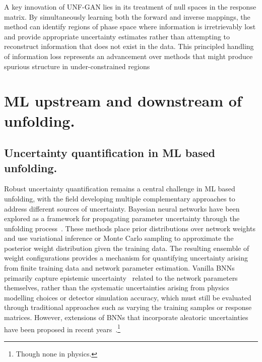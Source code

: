    A key innovation of UNF-GAN lies in its treatment of null spaces in the response matrix.
    By simultaneously learning both the forward and inverse mappings, the method can identify regions of phase space where information is irretrievably lost and provide appropriate uncertainty estimates rather than attempting to reconstruct information that does not exist in the data.
    This principled handling of information loss represents an advancement over methods that might produce spurious structure in under-constrained regions
\section{ML upstream and downstream of unfolding.}
    \subsection{Uncertainty quantification in ML based unfolding.}
    
    Robust uncertainty quantification remains a central challenge in ML based unfolding, with the field developing multiple complementary approaches to address different sources of uncertainty.
    Bayesian neural networks have been explored as a framework for propagating parameter uncertainty through the unfolding process~\cite{brehmer_guide_2018,Feindt:2004wla,Zhong:2011xm,perryBayesianNeuralNetworks2014,Chua:2019wwt,izmailovWhatAreBayesian2021,hronWideBayesianNeural2022,wenzelHowGoodBayes2020,Huetsch:2024quz,bonnevilleBayesianDeepLearning2022}.
    These methods place prior distributions over network weights and use variational inference or Monte Carlo sampling to approximate the posterior weight distribution given the training data.
    The resulting ensemble of weight configurations provides a mechanism for quantifying uncertainty arising from finite training data and network parameter estimation.
    Vanilla BNNs primarily capture epistemic uncertainty~\cite{mehraUncertaintyQuantificationDeep2021} related to the network parameters themselves, rather than the systematic uncertainties arising from physics modelling choices or detector simulation accuracy, which must still be evaluated through traditional approaches such as varying the training samples or response matrices.
    However, extensions of BNNs that incorporate aleatoric uncertainties have been proposed in recent years~\cite{munikotiGeneralFrameworkQuantifying2023,Kendall:2017tnb,depewegDecompositionUncertaintyBayesian2018}.\footnote{Though none in physics.}


